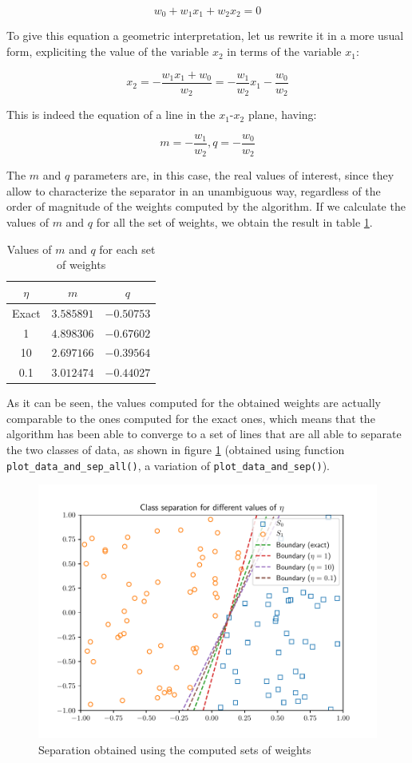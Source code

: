 \documentclass[letterpaper,headings=standardclasses]{scrartcl}
\begin{document}
$$ w_0 + w_1x_1 + w_2x_2 = 0 $$

To give this equation a geometric interpretation, let us rewrite it in a more usual form, expliciting the value of the variable $x_2$ in terms of the variable $x_1$:

$$ x_2 = -\frac{w_1x_1 + w_0}{w_2} = -\frac{w_1}{w_2}x_1 -\frac{w_0}{w_2} $$

This is indeed the equation of a line in the $x_1$-$x_2$ plane, having:

$$ m = -\frac{w_1}{w_2}, q = -\frac{w_0}{w_2} $$

The $m$ and $q$ parameters are, in this case, the real values of interest, since they allow to characterize the separator in an unambiguous way, regardless of the order of magnitude of the weights computed by the algorithm. If we calculate the values of $m$ and $q$ for all the set of weights, we obtain the result in table \ref{m_q_weights}.

\begin{table}[h]
\centering
\begin{tabular}{|c|c|c|}
\hline
$\eta$ & $m$ & $q$ \\ \hline
Exact  & $3.585891$ & $-0.50753$ \\ \hline
1      & $4.898306$ & $-0.67602$ \\ \hline
10     & $2.697166$ & $-0.39564$ \\ \hline
0.1    & $3.012474$ & $-0.44027$ \\ \hline
\end{tabular}
\caption{Values of $m$ and $q$ for each set of weights}
\label{m_q_weights}
\end{table}

As it can be seen, the values computed for the obtained weights are actually comparable to the ones computed for the exact ones, which means that the algorithm has been able to converge to a set of lines that are all able to separate the two classes of data, as shown in figure \ref{all_sep} (obtained using function \texttt{plot\_data\_and\_sep\_all()}, a variation of \texttt{plot\_data\_and\_sep()}).

\begin{figure}[h]
\centering
\includegraphics[width=0.7\linewidth]{all_sep.pdf}
\caption{Separation obtained using the computed sets of weights}
\label{all_sep}
\end{figure}
\end{document}

